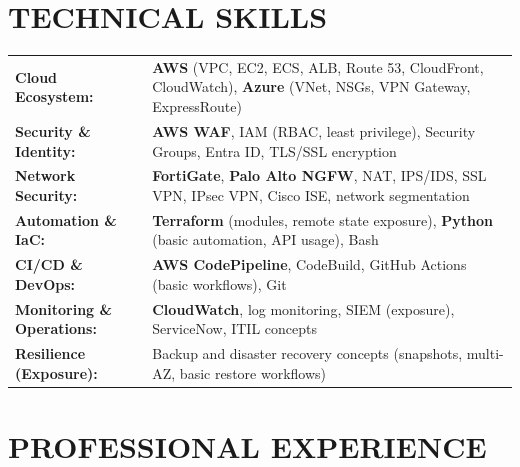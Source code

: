 \documentclass[10pt,a4paper]{article}
\begin{document}
\section*{TECHNICAL SKILLS}
\renewcommand{\arraystretch}{1.4}
\begin{tabularx}{\textwidth}{@{}l X@{}}
    \textbf{Cloud Ecosystem:} & \textbf{AWS} (VPC, EC2, ECS, ALB, Route 53, CloudFront, CloudWatch), \textbf{Azure} (VNet, NSGs, VPN Gateway, ExpressRoute) \\
    \textbf{Security \& Identity:} & \textbf{AWS WAF}, IAM (RBAC, least privilege), Security Groups, Entra ID, TLS/SSL encryption \\
    \textbf{Network Security:} & \textbf{FortiGate}, \textbf{Palo Alto NGFW}, NAT, IPS/IDS, SSL VPN, IPsec VPN, Cisco ISE, network segmentation \\
    \textbf{Automation \& IaC:} & \textbf{Terraform} (modules, remote state exposure), \textbf{Python} (basic automation, API usage), Bash \\
    \textbf{CI/CD \& DevOps:} & \textbf{AWS CodePipeline}, CodeBuild, GitHub Actions (basic workflows), Git \\
    \textbf{Monitoring \& Operations:} & \textbf{CloudWatch}, log monitoring, SIEM (exposure), ServiceNow, ITIL concepts \\
    \textbf{Resilience (Exposure):} & Backup and disaster recovery concepts (snapshots, multi-AZ, basic restore workflows)
\end{tabularx}

\section*{PROFESSIONAL EXPERIENCE}
\end{document}
